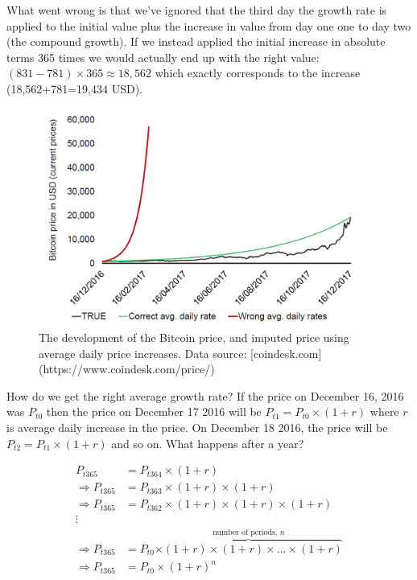 \documentclass[]{book}
\begin{document}
What went wrong is that we've ignored that the third day the growth rate is applied to the initial value plus the increase in value from day one one to day two (the compound growth). If we instead applied the initial increase in absolute terms 365 times we would actually end up with the right value: \((831-781)\times 365 \approx 18,562\) which exactly corresponds to the increase (18,562+781=19,434 USD).

\begin{figure}

{\centering \includegraphics[width=0.9\linewidth]{_resources/chapter_describe/bitcoin} 

}

\caption{The development of the Bitcoin price, and imputed price using average daily price increases. Data source: [coindesk.com](https://www.coindesk.com/price/)}\label{fig:desc3}
\end{figure}

How do we get the right average growth rate? If the price on December 16, 2016 was \(P_{t0}\) then the price on December 17 2016 will be \(P_{t1}=P_{t0}\times (1+r)\) where \(r\) is average daily increase in the price. On December 18 2016, the price will be \(P_{t2}=P_{t1}\times (1+r)\) and so on. What happens after a year?

\begin{align}
  P_{t365}&=P_{t364}\times (1+r)\nonumber\\
  \Rightarrow P_{t365}&=P_{t363}\times (1+r)\times (1+r)\nonumber\\
  \Rightarrow P_{t365}&=P_{t362}\times (1+r)\times (1+r)\times (1+r)\nonumber\\
  \vdots\nonumber\\
  \Rightarrow P_{t365}&=P_{t0}\overbrace{\times(1+r)\times(1+r)\times\dots\times(1+r)}^{\text{number of periods, }n}\nonumber\\
  \Rightarrow P_{t365}&=P_{t0}\times(1+r)^n\nonumber
\end{align}
\end{document}
